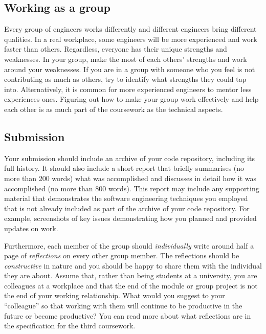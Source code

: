 \subsection{Working as a group}

Every group of engineers works differently and different engineers bring different qualities. In a real workplace, some engineers will be more experienced and work faster than others. Regardless, everyone has their unique strengths and weaknesses. In your group, make the most of each others' strengths and work around your weaknesses. If you are in a group with someone who you feel is not contributing as much as others, try to identify what strengths they could tap into. Alternatively, it is common for more experienced engineers to mentor less experiences ones. Figuring out how to make your group work effectively and help each other is as much part of the coursework as the technical aspects.

\subsection{Submission}

Your submission should include an archive of your code repository, including its full history. It should also include a short report that briefly summarises (no more than 200 words) what was accomplished and discusses in detail how it was accomplished (no more than 800 words). This report may include any supporting material that demonstrates the software engineering techniques you employed that is not already included as part of the archive of your code repository. For example, screenshots of key issues demonstrating how you planned and provided updates on work.

Furthermore, each member of the group should \emph{individually} write around half a page of \emph{reflections} on every other group member. The reflections should be \emph{constructive} in nature and you should be happy to share them with the individual they are about. Assume that, rather than being students at a university, you are colleagues at a workplace and that the end of the module or group project is not the end of your working relationship. What would you suggest to your ``colleague'' so that working with them will continue to be productive in the future or become productive? You can read more about what reflections are in the specification for the third coursework.


